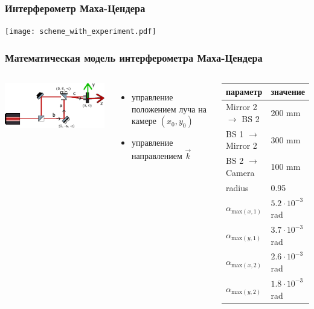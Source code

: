 \begin{frame}
\frametitle{Интерферометр Маха-Цендера}
  \centering
  \texttt{[image: scheme\_with\_experiment.pdf]}
\end{frame}


\begin{frame}
\frametitle{Математическая модель интерферометра Маха-Цендера}
\begin{columns}
  \centering
  \includegraphics[width=1\linewidth]{images/MZI_matmodel.pdf}
  \begin{itemize}
    \item управление положением луча на камере $(x_0, y_0)$
    \item управление направлением $\vec{k}$
  \end{itemize}

\begin{table} [htbp]
    \centering
    \begin{threeparttable}
        \begin{tabular}{| p{2.5cm} || p{2cm} |}
            \hline
            \hline
            параметр & значение \\
            \hline
            Mirror 2 $\to$ BS 2 & 200 mm\\
            BS 1 $\to$ Mirror 2 & 300 mm\\
            BS 2 $\to$ Camera & 100 mm\\
            radius & 0.95\\
            $\alpha_{{\mathrm{max}}(x,1)}$ & $5.2 \cdot 10^{-3}$ rad\\
            $\alpha_{{\mathrm{max}}(y,1)}$ & $3.7 \cdot 10^{-3}$ rad\\
            $\alpha_{{\mathrm{max}}(x,2)}$ & $2.6 \cdot 10^{-3}$ rad\\
            $\alpha_{{\mathrm{max}}(y,2)}$ & $1.8 \cdot 10^{-3}$ rad\\
            \hline
            \hline
        \end{tabular}
    \end{threeparttable}
\end{table}

\end{columns} 
\end{frame}


